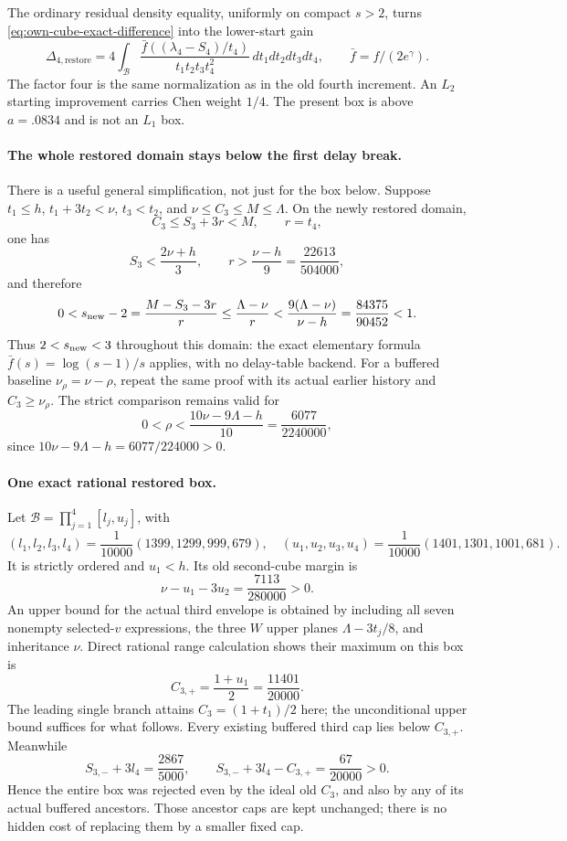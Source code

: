 The ordinary residual density equality, uniformly on compact $s>2$,
turns \eqref{eq:own-cube-exact-difference} into the lower-start gain
\begin{equation}\label{eq:own-cube-gain}
 \Delta_{4,\mathrm{restore}}=
 4\int_{\mathcal B}
 \frac{\bar f((\lambda_4-S_4)/t_4)}
 {t_1t_2t_3t_4^2}\,dt_1dt_2dt_3dt_4,
 \qquad \bar f=f/(2e^\gamma).
\end{equation}
The factor four is the same normalization as in the old fourth
increment. An $L_2$ starting improvement carries Chen weight $1/4$.
The present box is above $a=.0834$ and is not an $L_1$ box.

\paragraph{The whole restored domain stays below the first delay break.}
There is a useful general simplification, not just for the box below.
Suppose $t_1\le h$, $t_1+3t_2<\nu$, $t_3<t_2$, and
$\nu\le C_3\le M\le\Lambda$. On the newly restored domain,
\[
 C_3\le S_3+3r<M,\qquad r=t_4,
\]
one has
\[
 S_3<\frac{2\nu+h}{3},\qquad
 r>\frac{\nu-h}{9}=\frac{22613}{504000},
\]
and therefore
\[
 0<s_{\rm new}-2
 =\frac{M-S_3-3r}{r}
 \le\frac{\Lambda-\nu}{r}
 <\frac{9(\Lambda-\nu)}{\nu-h}
 =\frac{84375}{90452}<1.
\]
Thus $2<s_{\rm new}<3$ throughout this domain: the exact elementary
formula $\bar f(s)=\log(s-1)/s$ applies, with no delay-table backend.
For a buffered baseline $\nu_\rho=\nu-\rho$, repeat the same proof
with its actual earlier history and $C_3\ge\nu_\rho$.
The strict comparison remains valid for
\[
 0<\rho<\frac{10\nu-9\Lambda-h}{10}
           =\frac{6077}{2240000},
\]
since $10\nu-9\Lambda-h=6077/224000>0$.

\paragraph{One exact rational restored box.}
Let $\mathcal B=\prod_{j=1}^4[l_j,u_j]$, with
\[
 (l_1,l_2,l_3,l_4)=\frac1{10000}(1399,1299,999,679),
 \quad
 (u_1,u_2,u_3,u_4)=\frac1{10000}(1401,1301,1001,681).
\]
It is strictly ordered and $u_1<h$. Its old second-cube margin is
\[
 \nu-u_1-3u_2=\frac{7113}{280000}>0.
\]
An upper bound for the actual third envelope is obtained by including
all seven nonempty selected-$v$ expressions, the three $W$ upper
planes $\Lambda-3t_j/8$, and inheritance $\nu$. Direct rational
range calculation shows their maximum on this box is
\[
 C_{3,+}=\frac{1+u_1}{2}=\frac{11401}{20000}.
\]
The leading single branch attains $C_3=(1+t_1)/2$ here; the
unconditional upper bound suffices for what follows. Every existing
buffered third cap lies below $C_{3,+}$. Meanwhile
\[
 S_{3,-}+3l_4=\frac{2867}{5000},\qquad
 S_{3,-}+3l_4-C_{3,+}=\frac{67}{20000}>0.
\]
Hence the entire box was rejected even by the ideal old $C_3$, and
also by any of its actual buffered ancestors. Those ancestor caps
are kept unchanged; there is no hidden cost of replacing them by a
smaller fixed cap.

